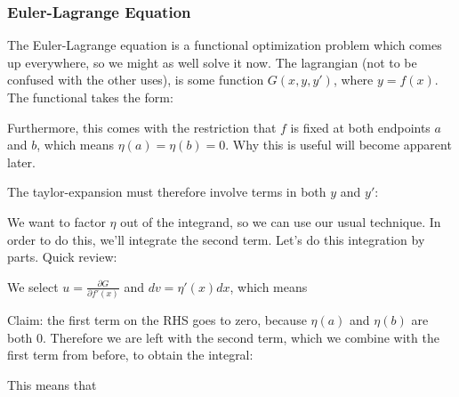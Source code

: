 \documentclass[12pt]{article}
\begin{document}
\subsubsection{Euler-Lagrange Equation}

The Euler-Lagrange equation is a functional optimization problem which comes up everywhere, so we might as well solve it now. The lagrangian (not to be confused with the other uses), is some function $G(x, y, y')$, where $y = f(x)$. The functional takes the form:


Furthermore, this comes with the restriction that $f$ is fixed at both endpoints $a$ and $b$, which means $\eta(a) = \eta(b) = 0$. Why this is useful will become apparent later.

The taylor-expansion must therefore involve terms in both $y$ and $y'$:


We want to factor $\eta$ out of the integrand, so we can use our usual technique. In order to do this, we'll integrate the second term. Let's do this integration by parts. Quick review:


We select $u = \frac{\partial G}{\partial f'(x)}$ and $dv = \eta'(x) dx$, which means



Claim: the first term on the RHS goes to zero, because $\eta(a)$ and $\eta(b)$ are both 0. Therefore we are left with the second term, which we combine with the first term from before, to obtain the integral:


This means that

\end{document}
